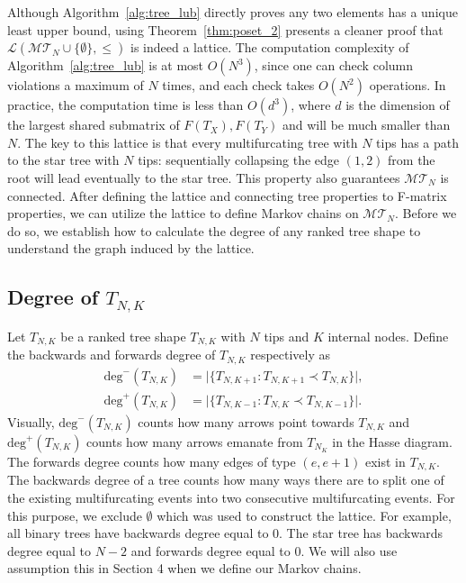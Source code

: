 \documentclass{article}
\begin{document}
Although Algorithm~\ref{alg:tree_lub} directly proves any two elements has a unique least upper bound, using Theorem~\ref{thm:poset_2} presents a cleaner proof that $\mathcal{L}(\mathcal{MT}_N\cup \{\emptyset\}, \leq )$ is indeed a lattice. The computation complexity of Algorithm~\ref{alg:tree_lub} is at most $O(N^3)$, since one can check column violations a maximum of $N$ times, and each check takes $O(N^2)$ operations. In practice, the computation time is less than $O(d^3)$, where $d$ is the dimension of the largest shared submatrix of $F(T_X), F(T_Y)$ and will be much smaller than $N$. The key to this lattice is that every multifurcating tree with $N$ tips has a path to the star tree with $N$ tips: sequentially collapsing the edge $(1,2)$ from the root will lead eventually to the star tree. This property also guarantees $\mathcal{MT}_N$ is connected. After defining the lattice and connecting tree properties to F-matrix properties, we can utilize the lattice to define Markov chains on $\mathcal{MT}_N$. Before we do so, we establish how to calculate the degree of any ranked tree shape to understand the graph induced by the lattice. 

\subsection{Degree of $T_{N,K}$}

Let $T_{N,K}$ be a ranked tree shape $T_{N,K}$ with $N$ tips and $K$ internal nodes. Define the backwards and forwards degree of $T_{N,K}$ respectively as  
\begin{align*}
    \text{deg}^-(T_{N,K}) &= \Big | \{ T_{N,K+1}: T_{N,K+1} \prec T_{N,K}\} \Big |, \\
    \text{deg}^+(T_{N,K}) &= \Big | \{ T_{N,K-1}: T_{N,K} \prec T_{N,K-1}\} \Big | .
\end{align*}
Visually, $\text{deg}^-(T_{N,K})$ counts how many arrows point towards $T_{N,K}$ and $\text{deg}^+(T_{N,K})$ counts how many arrows emanate from $T_{N_K}$ in the Hasse diagram. The forwards degree counts how many edges of type $(e,e+1)$ exist in $T_{N,K}$. The backwards degree of a tree counts how many ways there are to split one of the existing multifurcating events into two consecutive multifurcating events. For this purpose, we exclude $\emptyset$ which was used to construct the lattice. For example, all binary trees have backwards degree equal to 0. The star tree has backwards degree equal to $N-2$ and forwards degree equal to 0. We will also use assumption this in Section 4 when we define our Markov chains.
\end{document}
